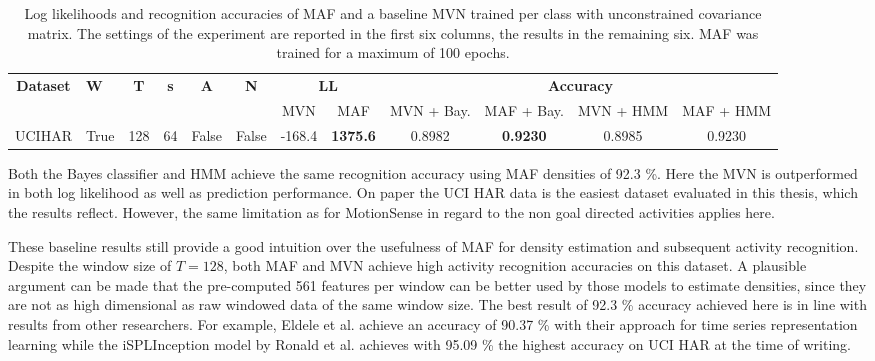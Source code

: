 \documentclass[11pt,titlepage,oneside,openany]{book}
\begin{document}
\begin{table}[H]
	\centering
	\tiny
	\begin{tabular}{c l c c c c c c c c c c}
		\toprule
		\multirow{2}{*}{\bfseries Dataset} & 
		\multirow{2}{*}{\bfseries W} & 
		\multirow{2}{*}{\bfseries T} &
		\multirow{2}{*}{\bfseries s} &
		\multirow{2}{*}{\bfseries A} &
		\multirow{2}{*}{\bfseries N} &
		\multicolumn{2}{c}{\bfseries LL} & 
		\multicolumn{4}{c}{\bfseries Accuracy}\\
		\cmidrule(lr){7-8}
		\cmidrule(lr){9-12}
		& & & & & & MVN & MAF & MVN + Bay. & MAF + Bay. & MVN + HMM & MAF + HMM \\
		\cmidrule(lr){1-12}
		UCIHAR &    True &     128 &      64 &    False &  False & -168.4 & \textbf{1375.6} &   0.8982 &   \textbf{0.9230} &   0.8985 &   0.9230 \\
		\bottomrule
	\end{tabular}
	\caption[Evaluation Results UCI HAR, Long]{\label{tab:uci} Log likelihoods and recognition accuracies of MAF and a baseline MVN trained per class with unconstrained covariance matrix. The settings of the experiment are reported in the first six columns, the results in the remaining six. MAF was trained for a maximum of 100 epochs.}
\end{table}

\noindent Both the Bayes classifier and HMM achieve the same recognition accuracy using MAF densities of 92.3 \%. Here the MVN is outperformed in both log likelihood as well as prediction performance. On paper the UCI HAR data is the easiest dataset evaluated in this thesis, which the results reflect. However, the same limitation as for MotionSense in regard to the non goal directed activities applies here.

These baseline results still provide a good intuition over the usefulness of MAF for density estimation and subsequent activity recognition. Despite the window size of $T=128$, both MAF and MVN achieve high activity recognition accuracies on this dataset. A plausible argument can be made that the pre-computed 561 features per window can be better used by those models to estimate densities, since they are not as high dimensional as raw windowed data of the same window size. The best result of 92.3 \% accuracy achieved here is in line with results from other researchers. For example, Eldele et al. \cite{eldele_time-series_2021} achieve an accuracy of 90.37 \% with their approach for time series representation learning while the iSPLInception model by Ronald et al. \cite{ronald_isplinception_2021} achieves with 95.09 \% the highest accuracy on UCI HAR at the time of writing.
\end{document}

